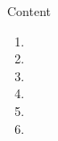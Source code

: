 \begin{frame}{Content}
  \begin{enumerate}%
    \setlength\itemsep{1em}%
    \item<1-> \tci{} \tei{}
    \item<2-> \tcii{} \teii{}
    \item<3-> \tciii{} \teiii{}
    \item<4-> \tciv{} \teiv{}
    \item<5-> \tcv{} \tev{}
    \item<6-> \tcvi{} \tevi{}
  \end{enumerate}
\end{frame}


